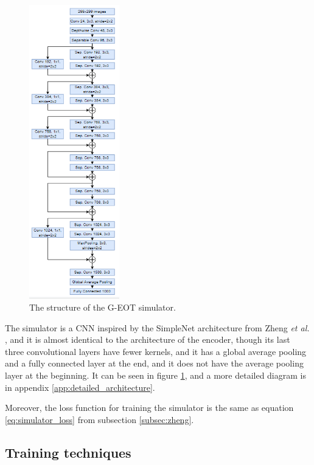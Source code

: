 \begin{figure}
    \centering
    \includegraphics[width=0.35\textwidth]{graphics/g_eot_simulator.PNG}
    \caption{The structure of the G-EOT simulator.}
    \label{fig:proposed_simulator}
\end{figure}

The simulator is a CNN inspired by the SimpleNet architecture from Zheng \textit{et al.} \cite{zheng_black_box_GAN}, and it is almost identical to the architecture of the encoder, though its last three convolutional layers have fewer kernels, and it has a global average pooling and a fully connected layer at the end, and it does not have the average pooling layer at the beginning. It can be seen in figure \ref{fig:proposed_simulator}, and a more detailed diagram is in appendix \ref{app:detailed_architecture}.

Moreover, the loss function for training the simulator is the same as equation \ref{eq:simulator_loss} from subsection \ref{subsec:zheng}.  

\subsection{Training techniques}
    \label{subsec:training}

